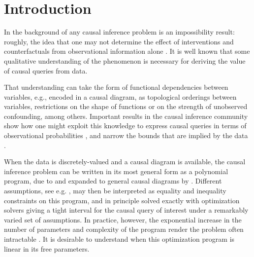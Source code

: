 \section{Introduction}
\label{sec:intro}
In the background of any causal inference problem is an impossibility result:
roughly, the idea that one may not determine the effect of interventions and counterfactuals from observational information alone \citep{pearl2009causality,bareinboim2022pearl}. It is well known that some qualitative understanding of the phenomenon is necessary for deriving the value of causal queries from data.

That understanding can take the form of functional dependencies between variables, e.g., encoded in a causal diagram, as topological orderings between variables, restrictions on the shape of functions or on the strength of unobserved confounding, among others. Important results in the causal inference community show how one might exploit this knowledge to express causal queries in terms of observational probabilities \citep{shpitser2006identification,pearl2009causality}, and narrow the bounds that are implied by the data \citep{balke1994bounds,balke1997bounds,zhang2022partial,duarte2024automated,bellot2023towards,bellot2024towards,symbolicbounds2023general,shridharan2023scalable}. %

When the data is discretely-valued and a causal diagram is available, the causal inference problem can be written in its most general form as a polynomial program, due to \citet{balke1994bounds,balke1997bounds} and expanded to general causal diagrams by \citet{zhang2022partial,duarte2024automated}. Different assumptions, see e.g. \citet{rosenbaum2002observational,tan2006distributional,masten2018identification}, may then be interpreted as equality and inequality constraints on this program, and in principle solved exactly with optimization solvers giving a tight interval for the causal query of interest under a remarkably varied set of assumptions. In practice, however, the exponential increase in the number of parameters and complexity of the program render the problem often intractable \citep{shridharan2023scalable}. It is desirable to understand when this optimization program is linear in its free parameters.

